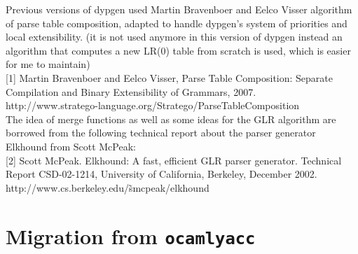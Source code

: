 \documentclass[12pt]{article}
\begin{document}
{Previous versions of dypgen used Martin Bravenboer and Eelco Visser algorithm of parse table composition, adapted to handle dypgen's system of priorities and local extensibility. (it is not used anymore in this version of dypgen instead an algorithm that computes a new LR(0) table from scratch is used, which is easier for me to maintain)\\

[1] Martin Bravenboer and Eelco Visser, Parse Table Composition: Separate Compilation and Binary Extensibility of Grammars, 2007.\\

http://www.stratego-language.org/Stratego/ParseTableComposition\\

The idea of merge functions as well as some ideas for the GLR algorithm are borrowed from the following technical report about the parser generator Elkhound from Scott McPeak:\\

[2] Scott McPeak. Elkhound: A fast, efficient GLR parser generator. Technical Report CSD-02-1214, University of California, Berkeley, December 2002.\\

http://www.cs.berkeley.edu/\~smcpeak/elkhound\\

\section{Migration from \texttt{ocamlyacc}}

}
\end{document}
